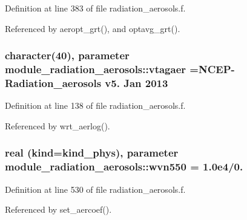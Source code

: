 Definition at line 383 of file radiation\+\_\+aerosols.\+f.



Referenced by aeropt\+\_\+grt(), and optavg\+\_\+grt().

\subsubsection[{\texorpdfstring{vtagaer}{vtagaer}}]{\setlength{\rightskip}{0pt plus 5cm}character(40), parameter module\+\_\+radiation\+\_\+aerosols\+::vtagaer =\textquotesingle{}N\+C\+EP-\/Radiation\+\_\+aerosols v5. Jan 2013 \textquotesingle{}\hspace{0.3cm}{\ttfamily [private]}}\hypertarget{namespacemodule__radiation__aerosols_a6d0e0cbcb4a13c1f80f6b1c41b13d3b8}{}\label{namespacemodule__radiation__aerosols_a6d0e0cbcb4a13c1f80f6b1c41b13d3b8}


Definition at line 138 of file radiation\+\_\+aerosols.\+f.



Referenced by wrt\+\_\+aerlog().

\subsubsection[{\texorpdfstring{wvn550}{wvn550}}]{\setlength{\rightskip}{0pt plus 5cm}real (kind=kind\+\_\+phys), parameter module\+\_\+radiation\+\_\+aerosols\+::wvn550 = 1.\+0e4/0.\hspace{0.3cm}{\ttfamily [private]}}\hypertarget{namespacemodule__radiation__aerosols_a4555a127ac5bab48353628ea81c55e4e}{}\label{namespacemodule__radiation__aerosols_a4555a127ac5bab48353628ea81c55e4e}


Definition at line 530 of file radiation\+\_\+aerosols.\+f.



Referenced by set\+\_\+aercoef().

